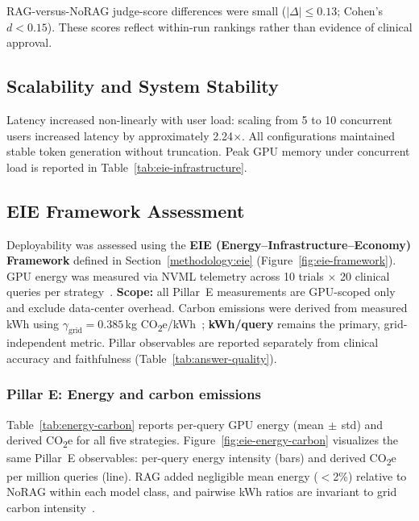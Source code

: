 RAG-versus-NoRAG judge-score differences were small ($|\Delta| \leq 0.13$; Cohen's $d < 0.15$). These scores reflect within-run rankings rather than evidence of clinical approval.

\subsection{Scalability and System Stability}

Latency increased non-linearly with user load: scaling from 5 to 10 concurrent users increased latency by approximately 2.24$\times$. All configurations maintained stable token generation without truncation. Peak GPU memory under concurrent load is reported in Table~\ref{tab:eie-infrastructure}.


\subsection{EIE Framework Assessment}
\label{results:eie}

Deployability was assessed using the \textbf{EIE (Energy--Infrastructure--Economy) Framework} defined in Section~\ref{methodology:eie} (Figure~\ref{fig:eie-framework}). GPU energy was measured via NVML telemetry across 10 trials $\times$ 20 clinical queries per strategy~\cite{patterson2021carbon,strubell2019energy}. \textbf{Scope:} all Pillar~E measurements are GPU-scoped only and exclude data-center overhead. Carbon emissions were derived from measured kWh using $\gamma_{\mathrm{grid}} = 0.385$\,kg CO\textsubscript{2}e/kWh~\cite{epa2023egrid}; \textbf{kWh/query} remains the primary, grid-independent metric. Pillar observables are reported separately from clinical accuracy and faithfulness (Table~\ref{tab:answer-quality}).

\subsubsection{Pillar E: Energy and carbon emissions}

Table~\ref{tab:energy-carbon} reports per-query GPU energy (mean$\,\pm$\,std) and derived CO\textsubscript{2}e for all five strategies. Figure~\ref{fig:eie-energy-carbon} visualizes the same Pillar~E observables: per-query energy intensity (bars) and derived CO\textsubscript{2}e per million queries (line). RAG added negligible mean energy ($<$2\%) relative to NoRAG within each model class, and pairwise kWh ratios are invariant to grid carbon intensity~\cite{ren2024reconciling}.

